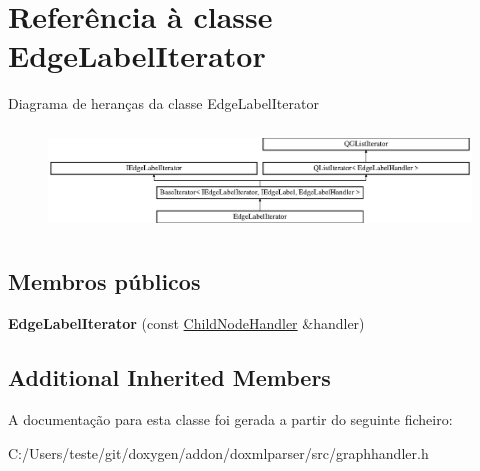 \hypertarget{class_edge_label_iterator}{\section{Referência à classe Edge\-Label\-Iterator}
\label{class_edge_label_iterator}
}
Diagrama de heranças da classe Edge\-Label\-Iterator\begin{figure}[H]
\begin{center}
\leavevmode
\includegraphics[height=2.793018cm]{class_edge_label_iterator}
\end{center}
\end{figure}
\subsection*{Membros públicos}
\begin{DoxyCompactItemize}
\item 
\hypertarget{class_edge_label_iterator_a700855f0bd5c943f4a70e45aa3a9acc9}{{\bfseries Edge\-Label\-Iterator} (const \hyperlink{class_child_node_handler}{Child\-Node\-Handler} \&handler)}\label{class_edge_label_iterator_a700855f0bd5c943f4a70e45aa3a9acc9}

\end{DoxyCompactItemize}
\subsection*{Additional Inherited Members}


A documentação para esta classe foi gerada a partir do seguinte ficheiro\-:\begin{DoxyCompactItemize}
\item 
C\-:/\-Users/teste/git/doxygen/addon/doxmlparser/src/graphhandler.\-h\end{DoxyCompactItemize}
